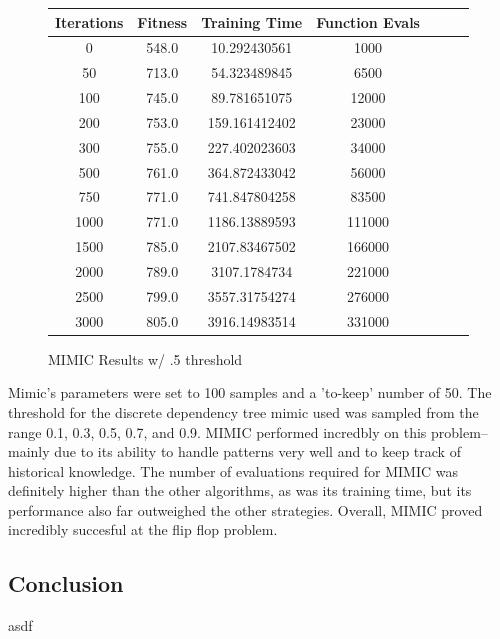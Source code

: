\documentclass[h]{article}
\begin{document}
\begin{figure}[H] 
\begin{tabular}{ | c | c  | c | c | c | c | c |} 
\hline
\textbf{Iterations} & \textbf{Fitness} & \textbf{Training Time} & \textbf{Function Evals}   \\
\hline
0 & 548.0 & 10.292430561 & 1000 \\ \hline 
50 & 713.0 & 54.323489845 & 6500 \\ \hline 
100 & 745.0 & 89.781651075 & 12000  \\ \hline 
200 & 753.0 & 159.161412402 & 23000  \\ \hline 
300 & 755.0 & 227.402023603 & 34000  \\ \hline 
500 & 761.0 & 364.872433042 & 56000 \\ \hline 
750 & 771.0 & 741.847804258 & 83500 \\ \hline 
1000 & 771.0 & 1186.13889593 & 111000 \\ \hline 
1500 & 785.0 & 2107.83467502 & 166000 \\ \hline 
2000 & 789.0 & 3107.1784734 & 221000 \\ \hline 
2500 & 799.0 & 3557.31754274 & 276000 \\ \hline 
3000 & 805.0 & 3916.14983514 & 331000 \\ \hline 
\end{tabular}
\caption*{MIMIC Results w/ .5 threshold} 
\end{figure}

Mimic's parameters were set to 100 samples and a 'to-keep' number of 50.  
The threshold for the discrete dependency tree mimic used was sampled from the 
range 0.1, 0.3, 0.5, 0.7, and 0.9.  MIMIC performed incredbly on this problem--mainly due to its ability to handle patterns very well and to keep track of historical 
knowledge.  The number of 
evaluations required for MIMIC was definitely higher than the other 
algorithms, as was its training time, but its performance also far outweighed the other strategies.  
Overall, MIMIC proved incredibly succesful at the flip flop problem.

\subsection*{ Conclusion}  
asdf
\end{document}

